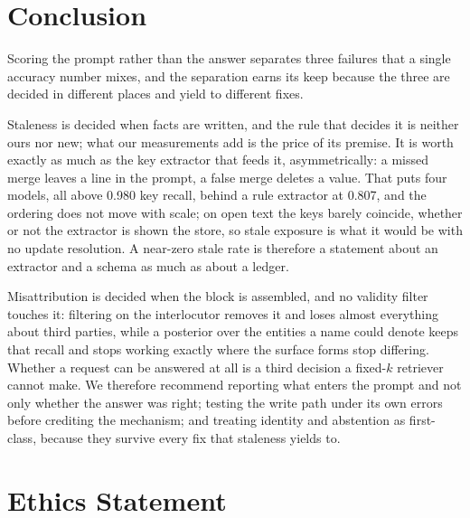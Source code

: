 \documentclass{article} %
\begin{document}
\section{Conclusion}

Scoring the prompt rather than the answer separates three failures that a single accuracy number mixes, and the separation earns its keep because the three are decided in different places and yield to different fixes.

Staleness is decided when facts are written, and the rule that decides it is neither ours nor new; what our measurements add is the price of its premise. It is worth exactly as much as the key extractor that feeds it, asymmetrically: a missed merge leaves a line in the prompt, a false merge deletes a value. That puts four models, all above 0.980 key recall, behind a rule extractor at 0.807, and the ordering does not move with scale; on open text the keys barely coincide, whether or not the extractor is shown the store, so stale exposure is what it would be with no update resolution. A near-zero stale rate is therefore a statement about an extractor and a schema as much as about a ledger.

Misattribution is decided when the block is assembled, and no validity filter touches it: filtering on the interlocutor removes it and loses almost everything about third parties, while a posterior over the entities a name could denote keeps that recall and stops working exactly where the surface forms stop differing. Whether a request can be answered at all is a third decision a fixed-$k$ retriever cannot make. We therefore recommend reporting what enters the prompt and not only whether the answer was right; testing the write path under its own errors before crediting the mechanism; and treating identity and abstention as first-class, because they survive every fix that staleness yields to.

\section*{Ethics Statement}
\label{sec:ethics}
\end{document}
